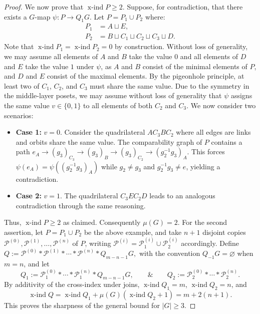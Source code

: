 \documentclass[preprint,12pt]{article}
\renewcommand{\ge}{\geqslant}
\theoremstyle{definition}
\theoremstyle{remark}
\numberwithin{equation}{section}
\DeclareMathOperator{\xind}{x-ind}
\begin{document}
\begin{proof}
We now prove that $\xind P\ge 2$. Suppose, for contradiction, that there exists a $G$-map $\psi \colon P \to Q_1G$.  Let $P = P_1 \cup P_2$ where:
\begin{align*}
P_1 &= A \sqcup E, \\
P_2 &= B \sqcup C_1 \sqcup C_2 \sqcup C_3 \sqcup D.
\end{align*}
Note that $\xind P_1 = \xind P_2 = 0$ by construction. Without loss of generality, we may assume all elements of $A$ and $B$ take the value $0$ and all elements of $D$ and $E$ take the value $1$ under $\psi$, as $A$ and $B$ consist of the minimal elements of $P$, and $D$ and $E$ consist of the maximal elements. By the pigeonhole principle, at least two of $C_1$, $C_2$, and $C_3$ must share the same value. Due to the symmetry in the middle-layer posets, we may assume without loss of generality that $\psi$ assigns the same value $v \in \{0,1\}$ to all elements of both $C_2$ and $C_3$. We now consider two scenarios:
\begin{itemize}
    \item \textbf{Case 1:} $v= 0$. Consider the quadrilateral $AC_3BC_2$ where all edges are links and orbits share the same value.  The comparability graph of $P$ contains a path $e_{A}\to (g_3)_{C_3}\to (g_3)_{B}\to (g_3)_{C_2}\to (g_2^{-1}g_3)_{A}$.
    This forces $\psi(e_{A}) = \psi((g_2^{-1}g_3)_{A})$ while $g_2 \neq g_3$ and $g_2^{-1}g_3\neq e$, yielding a contradiction. 
    \item \textbf{Case 2:} $v= 1$. The quadrilateral $C_3EC_2D$ leads to an analogous contradiction through the same reasoning.
\end{itemize}
Thus, $\xind P\ge 2$ as claimed. Consequently $\mu(G)=2$. For the second assertion, let \(P=P_1\cup P_2\) be the above example, and take \(n+1\) disjoint copies \(\mathcal P^{(0)},\mathcal P^{(1)},\dots,\mathcal P^{(n)}\) of \(P\), writing \(\mathcal P^{(i)}=\mathcal P_1^{(i)}\cup \mathcal P_2^{(i)}\) accordingly. Define
\(
Q:=\mathcal P^{(0)}*\mathcal P^{(1)}*\cdots *\mathcal P^{(n)}*Q_{m-n-1}G,
\)
with the convention \(Q_{-1}G=\varnothing\) when \(m=n\), and let
\[
Q_1:=\mathcal P_1^{(0)}*\cdots *\mathcal P_1^{(n)}*Q_{m-n-1}G,
\qquad\&\qquad
Q_2:=\mathcal P_2^{(0)}*\cdots *\mathcal P_2^{(n)}.
\]
By additivity of the cross-index under joins, \(\xind Q_1=m\), \(\xind Q_2=n\), and
\[
\xind Q
= \xind Q_1+\mu(G)(\xind Q_2+1)
= m+2(n+1).
\]
This proves the sharpness of the general bound for $|G|\ge 3$.
\end{proof}
\end{document}
